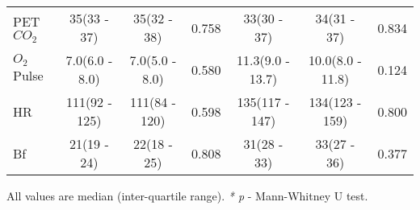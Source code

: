\begin{sidewaystable}[p]
\begin{tabular}{l | c c c | c c c}
		PET$CO_2$                    & 35(33 - 37)       & 35(32 - 38)       & 0.758 & 33(30 - 37)       & 34(31 - 37)       & 0.834 \\
		$O_2$Pulse                   & 7.0(6.0 - 8.0)    & 7.0(5.0 - 8.0)    & 0.580 & 11.3(9.0 - 13.7)  & 10.0(8.0 - 11.8)  & 0.124 \\
		HR                           & 111(92 - 125)     & 111(84 - 120)     & 0.598 & 135(117 - 147)    & 134(123 - 159)    & 0.800 \\
		Bf                           & 21(19 - 24)       & 22(18 - 25)       & 0.808 & 31(28 - 33)       & 33(27 - 36)       & 0.377 \\ \hline
	\end{tabular}
	
	
	All values are median (inter-quartile range). \textit{* p} - Mann-Whitney U test.
\end{sidewaystable}







